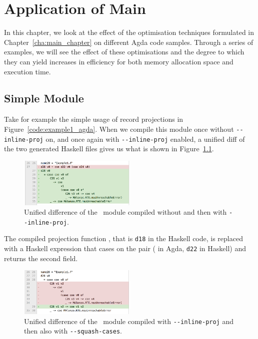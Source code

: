 \chapter{Application of Main}
\label{cha:application_of_main}

In this chapter, we look at the effect of the optimisation techniques formulated in Chapter~\ref{cha:main_chapter} on different Agda code samples. Through a series of examples, we will see the effect of these optimisations and the degree to which they can yield increases in efficiency for both memory allocation space and execution time.


\section{Simple Module}



Take for example the simple usage of record projections in Figure~\ref{code:example1_agda}. When we compile this module once without \texttt{-{}-inline-proj} on, and once again with \texttt{-{}-inline-proj} enabled, a unified diff of the two generated Haskell files gives us what is shown in Figure~\ref{fig:Example1_inline}.

\begin{figure}[h!]
    \centering
    \includegraphics[width=0.5\textwidth]{Figures/Example1_inline}
    \caption{Unified difference of the ~module compiled without and then with \texttt{-{}-inline-proj}.}
    \label{fig:Example1_inline}
\end{figure}

The compiled projection function , that is \lstinline{d18} in the Haskell code, is replaced with a Haskell expression that cases on the pair ( in Agda, \lstinline{d22} in Haskell) and returns the second field.

\begin{figure}[h!]
    \centering
    \includegraphics[width=0.5\textwidth]{Figures/Example1_squash}
    \caption{Unified difference of the ~module compiled  with \texttt{-{}-inline-proj} and then also with \texttt{-{}-squash-cases}.}
    \label{fig:Example1_squash}
\end{figure}

